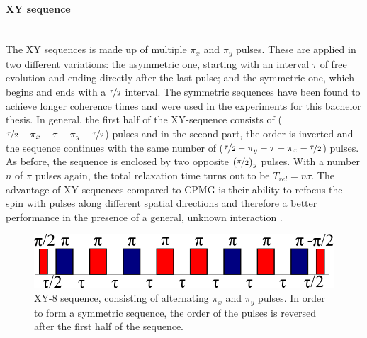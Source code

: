 \documentclass[12pt,a4paper]{article}
\begin{document}
\paragraph{XY sequence}\mbox{}\\
The XY sequences is made up of multiple $\pi_x$ and $\pi_y$ pulses. These are applied in two different variations: the asymmetric one, starting with an interval $\tau$ of free evolution and ending directly after the last pulse; and the symmetric one, which begins and ends with a $\nicefrac{\tau}{2}$ interval. The symmetric sequences have been found to achieve longer coherence times\cite{sas}\cite{sas2} and were used in the experiments for this bachelor thesis. In general, the first half of the XY-sequence consists of ($\nicefrac{\tau}{2}-\pi_x-\tau-\pi_y-\nicefrac{\tau}{2}$) pulses and in the second part, the order is inverted and the sequence continues with the same number of ($\nicefrac{\tau}{2}-\pi_y-\tau-\pi_x-\nicefrac{\tau}{2}$) pulses. As before, the sequence is enclosed by two opposite $(\nicefrac{\pi}{2})_y$ pulses. With a number $n$ of $\pi$ pulses again, the total relaxation time turns out to be $T_{rel}=n\tau$. The advantage of XY-sequences compared to CPMG is their ability to refocus the spin with pulses along different spatial directions and therefore a better performance in the presence of a general, unknown interaction \cite{dd}\cite{rdc}.
\begin{figure}[H]
\centering
\includegraphics[scale=0.4]{XY81.png} 
\caption{XY-8 sequence, consisting of alternating $\pi_x$ and $\pi_y$ pulses. In order to form a symmetric sequence, the order of the pulses is reversed after the first half of the sequence.}
\end{figure} 
\newpage
\end{document}
